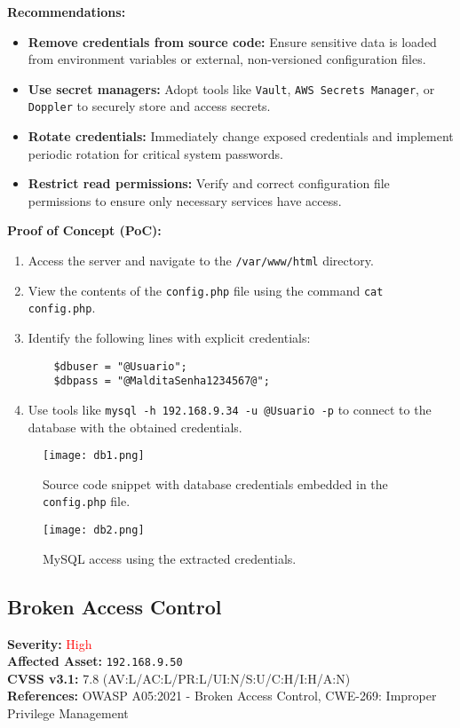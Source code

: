 \documentclass[a4paper,12pt]{article}
\begin{document}
\textbf{Recommendations:}  
\begin{itemize}
    \item \textbf{Remove credentials from source code:} Ensure sensitive data is loaded from environment variables or external, non-versioned configuration files.  
    \item \textbf{Use secret managers:} Adopt tools like \texttt{Vault}, \texttt{AWS Secrets Manager}, or \texttt{Doppler} to securely store and access secrets.  
    \item \textbf{Rotate credentials:} Immediately change exposed credentials and implement periodic rotation for critical system passwords.  
    \item \textbf{Restrict read permissions:} Verify and correct configuration file permissions to ensure only necessary services have access.  
\end{itemize}

\textbf{Proof of Concept (PoC):}  
\begin{enumerate}
    \item Access the server and navigate to the \texttt{/var/www/html} directory.  
    \item View the contents of the \texttt{config.php} file using the command \texttt{cat config.php}.  
    \item Identify the following lines with explicit credentials:
    \begin{verbatim}
    $dbuser = "@Usuario";
    $dbpass = "@MalditaSenha1234567@";
    \end{verbatim}
    \item Use tools like \texttt{mysql -h 192.168.9.34 -u @Usuario -p} to connect to the database with the obtained credentials.  
\end{enumerate}

\begin{figure}[H]
    \centering
    \texttt{[image: db1.png]}
    \caption{Source code snippet with database credentials embedded in the \texttt{config.php} file.}
\end{figure}

\begin{figure}[H]
    \centering
    \texttt{[image: db2.png]}
    \caption{MySQL access using the extracted credentials.}
\end{figure}

\clearpage

\subsection{Broken Access Control}
\textbf{Severity:} \textcolor{Red}{High} \\
\textbf{Affected Asset:} \texttt{192.168.9.50} \\
\textbf{CVSS v3.1:} 7.8 (AV:L/AC:L/PR:L/UI:N/S:U/C:H/I:H/A:N) \\
\textbf{References:} OWASP A05:2021 - Broken Access Control, CWE-269: Improper Privilege Management
\end{document}
